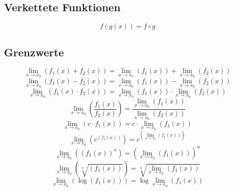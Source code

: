 \subsection{Verkettete Funktionen}
\[ \boxed{f(g(x)) = f \circ g} \]

\subsection{Grenzwerte}
\[ \boxed{\lim\limits_{x \to x_0}(f_1(x) + f_2(x)) = \lim\limits_{x \to x_0}(f_1(x)) + \lim\limits_{x \to x_0}(f_2(x))} \]
\[ \boxed{\lim\limits_{x \to x_0}(f_1(x) - f_2(x)) = \lim\limits_{x \to x_0}(f_1(x)) - \lim\limits_{x \to x_0}(f_2(x))} \]
\[ \boxed{\lim\limits_{x \to x_0}(f_1(x) \cdot f_2(x)) = \lim\limits_{x \to x_0}(f_1(x)) \cdot \lim\limits_{x \to x_0}(f_2(x))} \]
\[ \boxed{\lim\limits_{x \to x_0}\left(\frac{f_1(x)}{f_2(x)}\right) = \frac{\lim\limits_{x \to x_0}(f_1(x))}{\lim\limits_{x \to x_0}(f_2(x))}} \]
\[ \boxed{\lim\limits_{x \to x_0}(c \cdot f_1(x)) = c \cdot \lim\limits_{x \to x_0}(f_1(x))} \]
\[ \boxed{\lim\limits_{x \to x_0}\left(c^{(f_1(x))}\right) = c^{\left(\lim\limits_{x \to x_0}(f_1(x))\right)}} \]
\[ \boxed{\lim\limits_{x \to x_0}\left((f_1(x))^n\right) = \left(\lim\limits_{x \to x_0}(f_1(x))\right)^n} \]
\[ \boxed{\lim\limits_{x \to x_0}\left(\sqrt[n]{(f_1(x))}\right) = \sqrt[n]{\lim\limits_{x \to x_0}(f_1(x))}} \]
\[ \boxed{\lim\limits_{x \to x_0}\left(\log{(f_1(x))}\right) = \log{\lim\limits_{x \to x_0}(f_1(x))}} \]


